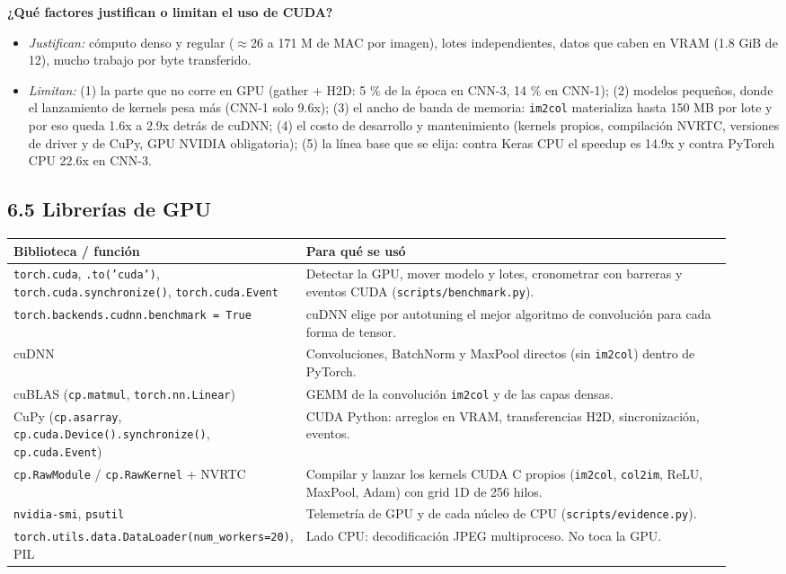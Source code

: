 \documentclass[
  11pt,
]{article}
\providecommand{\tightlist}{%
  \setlength{\itemsep}{0pt}\setlength{\parskip}{0pt}}
\begin{document}
\textbf{¿Qué factores justifican o limitan el uso de CUDA?}
\begin{itemize}
\tightlist
\item \emph{Justifican:} cómputo denso y regular (\(\approx\)26 a 171 M de MAC por imagen),
  lotes independientes, datos que caben en VRAM (1.8 GiB de 12), mucho trabajo por byte
  transferido.
\item \emph{Limitan:} (1) la parte que no corre en GPU (gather + H2D: 5 \% de la época en
  CNN-3, 14 \% en CNN-1); (2) modelos pequeños, donde el lanzamiento de kernels pesa más
  (CNN-1 solo 9.6x); (3) el ancho de banda de memoria: \texttt{im2col} materializa hasta
  150 MB por lote y por eso queda 1.6x a 2.9x detrás de cuDNN; (4) el costo de desarrollo
  y mantenimiento (kernels propios, compilación NVRTC, versiones de driver y de CuPy,
  GPU NVIDIA obligatoria); (5) la línea base que se elija: contra Keras CPU el speedup es
  14.9x y contra PyTorch CPU 22.6x en CNN-3.
\end{itemize}

\subsection{6.5 Librerías de GPU}\label{librerias-gpu}

\begin{longtable}[]{@{}p{0.27\linewidth}p{0.66\linewidth}@{}}
\toprule\noalign{}
Biblioteca / función & Para qué se usó \\
\midrule\noalign{}
\endhead
\bottomrule\noalign{}
\endlastfoot
\texttt{torch.cuda}, \texttt{.to('cuda')}, \texttt{torch.cuda.synchronize()}, \texttt{torch.cuda.Event} & Detectar la GPU, mover modelo y lotes, cronometrar con barreras y eventos CUDA (\texttt{scripts/benchmark.py}). \\
\texttt{torch.backends.cudnn.benchmark = True} & cuDNN elige por autotuning el mejor algoritmo de convolución para cada forma de tensor. \\
cuDNN & Convoluciones, BatchNorm y MaxPool directos (sin \texttt{im2col}) dentro de PyTorch. \\
cuBLAS (\texttt{cp.matmul}, \texttt{torch.nn.Linear}) & GEMM de la convolución \texttt{im2col} y de las capas densas. \\
CuPy (\texttt{cp.asarray}, \texttt{cp.cuda.Device().synchronize()}, \texttt{cp.cuda.Event}) & CUDA Python: arreglos en VRAM, transferencias H2D, sincronización, eventos. \\
\texttt{cp.RawModule} / \texttt{cp.RawKernel} + NVRTC & Compilar y lanzar los kernels CUDA C propios (\texttt{im2col}, \texttt{col2im}, ReLU, MaxPool, Adam) con grid 1D de 256 hilos. \\
\texttt{nvidia-smi}, \texttt{psutil} & Telemetría de GPU y de cada núcleo de CPU (\texttt{scripts/evidence.py}). \\
\texttt{torch.utils.data.DataLoader(num\_workers=20)}, PIL & Lado CPU: decodificación JPEG multiproceso. No toca la GPU. \\
\end{longtable}
\end{document}
